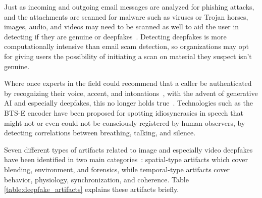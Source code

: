 Just as incoming and outgoing email messages are analyzed for phishing attacks, and the attachments are scanned for malware such as viruses or Trojan horses, images, audio, and videos may need to be scanned as well to aid the user in detecting if they are genuine or deepfakes~\citep{mirsky_Creation_Detection_Deepfakes_2021}. Detecting deepfakes is more computationally intensive than email scam detection, so organizations may opt for giving users the possibility of initiating a scan on material they suspect isn’t genuine.

Where once experts in the field could recommend that a caller be authenticated by recognizing their voice, accent, and intonations~\citep{mitnick_The_Art_of_Deception_2003}, with the advent of generative AI and especially deepfakes, this no longer holds true~\citep{doan_BTSE_Audio_Deepfake_Detection_2023}. Technologies such as the BTS-E encoder have been proposed for spotting idiosyncrasies in speech that might not or even could not be consciously registered by human observers, by detecting correlations between breathing, talking, and silence.

%
%
Seven different types of artifacts related to image and especially video deepfakes have been identified in two main categories~\citep{mirsky_Creation_Detection_Deepfakes_2021}: spatial-type artifacts which cover blending, environment, and forensics, while temporal-type artifacts cover behavior, physiology, synchronization, and coherence. Table \ref{table:deepfake_artifacts} explains these artifacts briefly.

